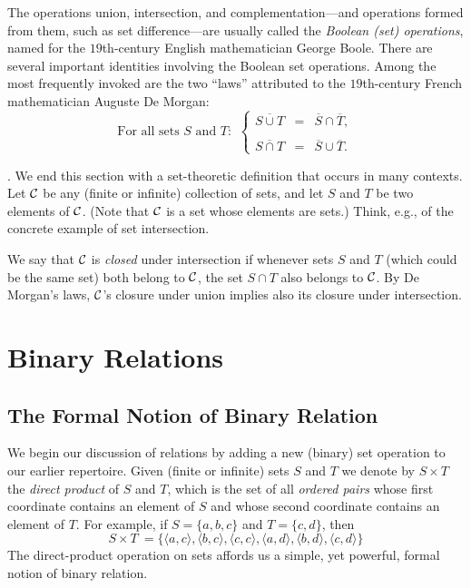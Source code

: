 The operations union, intersection, and complementation---and
operations formed from them, such as set difference---are usually
called the {\em Boolean (set) operations},
named for the $19$th-century English mathematician George
Boole.  There are several important identities
involving the Boolean set operations.  Among the most frequently
invoked are the two ``laws'' attributed to the $19$th-century French
mathematician Auguste De Morgan:
\begin{equation}
\label{e.de-morgan}
\mbox{For all sets $S$ and $T$: } \ \left\{
\begin{array}{lcl}
\overline{S \cup T} & = & \overline{S} \cap \overline{T}, \\
 \\
\overline{S \cap T} & = & \overline{S} \cup \overline{T}.
\end{array}
\right.
\end{equation}

.
%
We end this section with a set-theoretic definition that occurs in
many contexts.  Let $\cal C$ be any (finite or infinite) collection of
sets, and let $S$ and $T$ be two elements of $\cal C$.  (Note that
$\cal C$ is a set whose elements are sets.)  Think, e.g., of the
concrete example of set intersection.

We say that $\cal C$ is {\em closed} under intersection if whenever
sets $S$ and $T$ (which could be the same set) both belong to $\cal
C$, the set $S \cap T$ also belongs to $\cal C$.  By De Morgan's laws,
$\cal C$'s closure under union implies also its closure under
intersection.

\section{Binary Relations}
\label{s.relation}

\subsection{The Formal Notion of Binary Relation}
\label{s.relation-basic}

We begin our discussion of relations by adding a new (binary) set
operation to our earlier repertoire.  Given (finite or infinite) sets
$S$ and $T$ we denote by $S \times T$ the {\it
  direct product} of $S$ and $T$, which
is the set of all {\it ordered pairs} whose first coordinate contains an element of $S$ and
whose second coordinate contains an element of $T$.  For example, if
$S = \{a,b,c\}$ and $T = \{c,d\}$, then
\[ S \times T \ =  \{
\langle a,c \rangle,
\langle b,c \rangle,
\langle c,c \rangle,
\langle a,d \rangle,
\langle b,d \rangle,
\langle c,d \rangle\}
\]
The direct-product operation on sets affords us a simple, yet
powerful, formal notion of binary relation.

